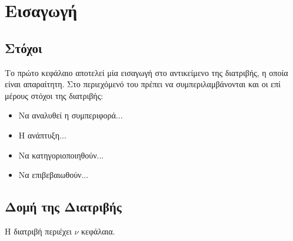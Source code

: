 \chapter{Εισαγωγή}
\label{ch:Introduction}


\section{Στόχοι}
\label{sec:Objectives}
Το πρώτο κεφάλαιο αποτελεί μία εισαγωγή στο αντικείμενο της διατριβής, η οποία είναι απαραίτητη.
Στο περιεχόμενό του πρέπει να συμπεριλαμβάνονται και οι επί μέρους στόχοι της διατριβής:
\begin{itemize}
	\item Να αναλυθεί η συμπεριφορά...
	\item Η ανάπτυξη...
	\item Να κατηγοριοποιηθούν...
	\item Να επιβεβαιωθούν...
\end{itemize}


\section{Δομή της Διατριβής}
\label{sec:Structure}
Η διατριβή περιέχει $\nu$ κεφάλαια.